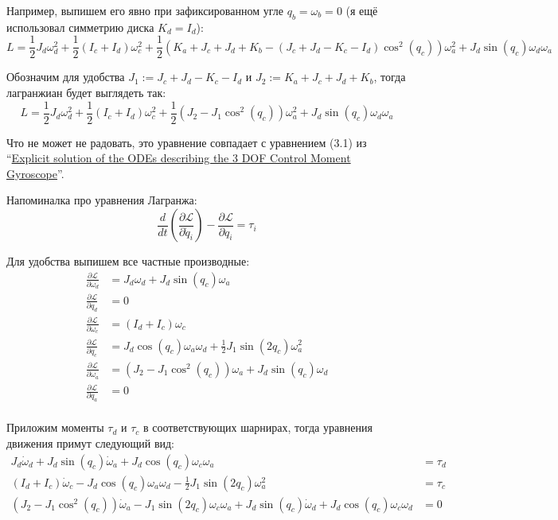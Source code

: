 \documentclass{article}
\begin{document}
Например, выпишем его явно при зафиксированном угле $q_b=\omega_b=0$ (я ещё использовал симметрию диска $K_d=I_d$):
$$
L=\frac{1}{2}J_d \omega_d^2 + \frac{1}{2}(I_c+I_d) \omega_c^2 + \frac{1}{2}\left(K_a+J_c+J_d+K_b - (J_c+J_d-K_c-I_d) \cos^2(q_c)\right) \omega_a^2 + J_d \sin(q_c) \omega_d \omega_a
$$

Обозначим для удобства $J_1:=J_c+J_d-K_c-I_d$ и $J_2:=K_a+J_c+J_d+K_b$, тогда лагранжиан будет выглядеть так:
$$
L=\frac{1}{2}J_d \omega_d^2 + \frac{1}{2}(I_c+I_d) \omega_c^2 + \frac{1}{2}\left(J_2 - J_1 \cos^2(q_c)\right) \omega_a^2 + J_d \sin(q_c) \omega_d \omega_a
$$


Что не может не радовать, это уравнение совпадает с уравнением (3.1) из ``\href{http://www.mate.tue.nl/mate/pdfs/9731.pdf}{Explicit solution of the ODEs describing the 3 DOF Control Moment Gyroscope}''.

Напоминалка про уравнения Лагранжа:
$$
\frac{d}{dt}\left(\frac{\partial\mathcal L}{\partial\dot q_i}\right) - \frac{\partial\mathcal L}{\partial q_i} = \tau_i
$$

Для удобства выпишем все частные производные:
\begin{align*}
\frac{\partial\mathcal L}{\partial\omega_d} &=  J_d \omega_d + J_d \sin(q_c) \omega_a \\
\frac{\partial\mathcal L}{\partial q_d} & =  0\\
\frac{\partial\mathcal L}{\partial\omega_c} &= (I_d+I_c)\omega_c \\
\frac{\partial\mathcal L}{\partial q_c} &= J_d \cos(q_c) \omega_a \omega_d + \frac{1}{2}J_1  \sin(2 q_c) \omega_a^2  \\
\frac{\partial\mathcal L}{\partial\omega_a}  &= \left(J_2 - J_1 \cos^2(q_c)\right) \omega_a  + J_d \sin(q_c) \omega_d \\
\frac{\partial\mathcal L}{\partial q_a}   &= 0\\
\end{align*}

Приложим моменты $\tau_d$ и $\tau_c$ в соответствующих шарнирах, тогда уравнения движения примут следующий вид:
\begin{align*}
 J_d \dot\omega_d + J_d \sin(q_c)\dot \omega_a + J_d \cos(q_c)\omega_c\omega_a &=\tau_d\\
(I_d+I_c)\dot\omega_c - J_d \cos(q_c) \omega_a \omega_d - \frac{1}{2}J_1  \sin(2 q_c) \omega_a^2  &= \tau_c \\
\left(J_2 - J_1 \cos^2(q_c)\right)\dot \omega_a - J_1 \sin(2 q_c)\omega_c\omega_a +  J_d \sin(q_c) \dot\omega_d + J_d \cos(q_c) \omega_c\omega_d &= 0\\
\end{align*}
\end{document}
